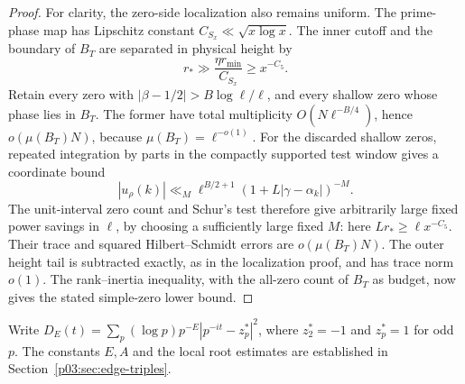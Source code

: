 \documentclass[11pt,letterpaper]{article}
\theoremstyle{definition}
\theoremstyle{remark}
\newcommand{\1}{\mathbf 1}
\begin{document}
\begin{proof}
For clarity, the zero-side localization also remains uniform.
The prime-phase map has Lipschitz constant
$C_{S_x}\ll\sqrt{x\log x}$. The inner cutoff and the boundary of
$B_T$ are separated in physical height by
\[
 r_*\gg\frac{\eta r_{\min}}{C_{S_x}}\ge x^{-C_5}.
\]
Retain every zero with $|\beta-1/2|>B\log\ell/\ell$,
and every shallow zero whose phase lies in $B_T$.
The former have total multiplicity $O(N\ell^{-B/4})$, hence
$o(\mu(B_T)N)$, because $\mu(B_T)=\ell^{-o(1)}$.
For the discarded shallow zeros, repeated integration by parts
in the compactly supported test window gives a coordinate bound
\[
 |u_\rho(k)|\ll_M\ell^{B/2+1}
                (1+L|\gamma-\alpha_k|)^{-M}.
\]
The unit-interval zero count and Schur's test therefore give
arbitrarily large fixed power savings in $\ell$, by choosing
a sufficiently large fixed $M$: here $Lr_*\ge\ell x^{-C_5}$.
Their trace and squared Hilbert--Schmidt errors are
$o(\mu(B_T)N)$. The outer height tail is subtracted exactly,
as in the localization proof, and has trace norm $o(1)$.
The rank--inertia inequality, with the all-zero count of $B_T$
as budget, now gives the stated simple-zero lower bound.
\end{proof}

Write $D_E(t)=\sum_p(\log p)p^{-E}|p^{-it}-z_p^*|^2$,
where $z_2^*=-1$ and $z_p^*=1$ for odd $p$. The constants $E,A$
and the local root estimates are established in
Section~\ref{p03:sec:edge-triples}.
\end{document}
